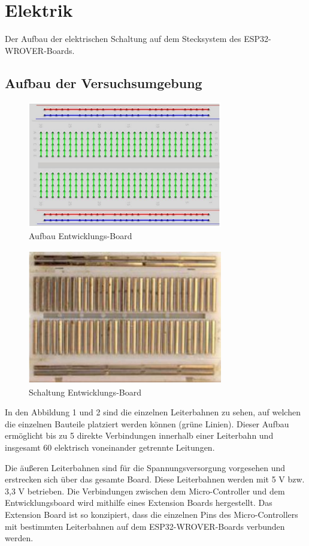 \documentclass[conference,compsoc,final,a4paper]{IEEEtran}
\begin{document}
\section{Elektrik}
Der Aufbau der elektrischen Schaltung auf dem Stecksystem des ESP32-WROVER-Boards.

\subsection{Aufbau der Versuchsumgebung}
\begin{figure}[h]
\centering
\includegraphics[width=8.5cm]{../images/board.png}
\caption{Aufbau Entwicklungs-Board}
\label{Elektrik:DevBoard}
\end{figure}
\begin{figure}[h]
\centering
\includegraphics[width=8.5cm]{../images/board2.png}
\caption{Schaltung Entwicklungs-Board}
\label{Elektrik:DevBoardInternal}
\end{figure}

In den Abbildung 1 und 2 sind die einzelnen Leiterbahnen zu sehen, auf welchen die einzelnen Bauteile platziert werden können (grüne Linien). 
Dieser Aufbau ermöglicht bis zu 5 direkte Verbindungen innerhalb einer Leiterbahn und insgesamt 60 elektrisch voneinander getrennte Leitungen.

Die äußeren Leiterbahnen sind für die Spannungsversorgung vorgesehen und erstrecken sich über das gesamte Board. Diese Leiterbahnen werden mit 5 V bzw. 3,3 V betrieben.
Die Verbindungen zwischen dem Micro-Controller und dem Entwicklungsboard wird mithilfe eines Extension Boards hergestellt. Das Extension Board ist so konzipiert, 
dass die einzelnen Pins des Micro-Controllers mit bestimmten Leiterbahnen auf dem ESP32-WROVER-Boards verbunden werden.
\end{document}
